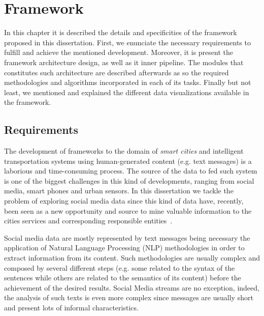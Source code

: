 \chapter{Framework} \label{chap:framework}

\minitoc \mtcskip \noindent

In this chapter it is described the details and specificities of the framework proposed in this dissertation. First, we enunciate the necessary requirements to fulfill and achieve the mentioned development. Moreover, it is present the framework architecture design, as well as it inner pipeline. The modules that constitutes such architecture are described afterwards as so the required methodologies and algorithms incorporated in each of its tasks. Finally but not least, we mentioned and explained the different data visualizations available in the framework.

\section{Requirements}\label{sec:requirements}

The development of frameworks to the domain of \textit{smart cities} and intelligent transportation systems using human-generated content (e.g. text messages) is a laborious and time-consuming process. The source of the data to fed such system is one of the biggest challenges in this kind of developments, ranging from social media, smart phones and urban sensors. In this dissertation we tackle the problem of exploring social media data since this kind of data have, recently, been seen as a new opportunity and source to mine valuable information to the cities services and corresponding responsible entities~\cite{kn:Musto2015}.

Social media data are mostly represented by text messages being necessary the application of Natural Language Processing (NLP) methodologies in order to extract information from its content. Such methodologies are usually complex and composed by several different steps (e.g. some related to the syntax of the sentences while others are related to the semantics of its content) before the achievement of the desired results. Social Media streams are no exception, indeed, the analysis of such texts is even more complex since messages are usually short and present lots of informal characteristics.

